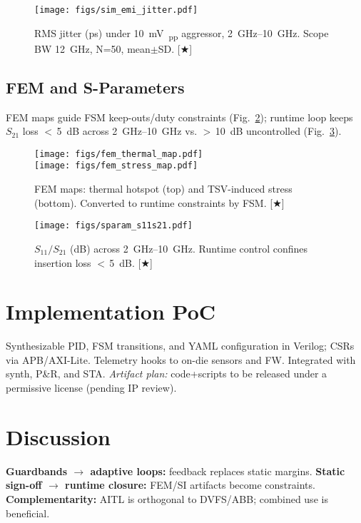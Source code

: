 \documentclass[conference]{IEEEtran}
\begin{document}
\begin{figure}[t]
\centering
\texttt{[image: figs/sim\_emi\_jitter.pdf]}
\caption{RMS jitter (ps) under \SI{10}{mV\textsubscript{pp}} aggressor, \SIrange{2}{10}{GHz}. Scope BW \SI{12}{GHz}, N=50, mean$\pm$SD. [★]}
\label{fig:emi}
\end{figure}

\subsection{FEM and S-Parameters}
FEM maps guide FSM keep-outs/duty constraints (Fig.~\ref{fig:fem}); runtime loop keeps $S_{21}$ loss $<\,$\SI{5}{dB} across \SIrange{2}{10}{GHz} vs. $>\,$\SI{10}{dB} uncontrolled (Fig.~\ref{fig:sparam}).

\begin{figure}[t]
\centering
\texttt{[image: figs/fem\_thermal\_map.pdf]}\\[3pt]
\texttt{[image: figs/fem\_stress\_map.pdf]}
\caption{FEM maps: thermal hotspot (top) and TSV-induced stress (bottom). Converted to runtime constraints by FSM. [★]}
\label{fig:fem}
\end{figure}

\begin{figure}[t]
\centering
\texttt{[image: figs/sparam\_s11s21.pdf]}
\caption{$S_{11}/S_{21}$ (dB) across \SIrange{2}{10}{GHz}. Runtime control confines insertion loss $<\,$\SI{5}{dB}. [★]}
\label{fig:sparam}
\end{figure}

\section{Implementation PoC}
Synthesizable PID, FSM transitions, and YAML configuration in Verilog; CSRs via APB/AXI-Lite. Telemetry hooks to on-die sensors and FW. Integrated with synth, P\&R, and STA. \textit{Artifact plan:} code+scripts to be released under a permissive license (pending IP review).

\section{Discussion}
\textbf{Guardbands $\rightarrow$ adaptive loops:} feedback replaces static margins.  
\textbf{Static sign-off $\rightarrow$ runtime closure:} FEM/SI artifacts become constraints.  
\textbf{Complementarity:} AITL is orthogonal to DVFS/ABB; combined use is beneficial.  
\end{document}
